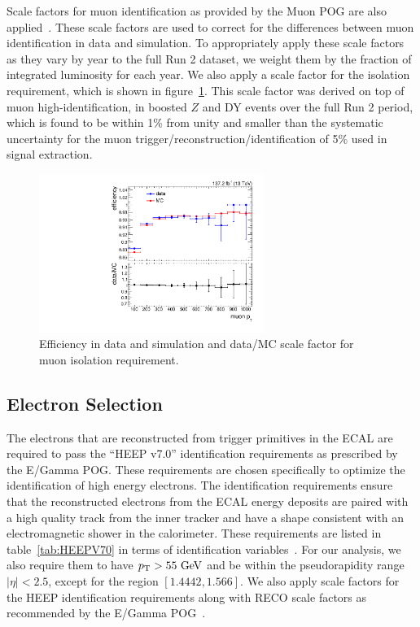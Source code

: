 Scale factors for muon identification as provided by the Muon POG are also applied~\cite{MuonPAGs}.
These scale factors are used to correct for the differences between muon identification in data and simulation.
To appropriately apply these scale factors as they vary by year to the full Run 2 dataset, we weight them by the fraction of integrated luminosity for each year.
We also apply a scale factor for the isolation requirement, which is shown in figure~\ref{fig:muonIsoSF}.
This scale factor was derived on top of muon high-\pt identification, in boosted $Z$ and DY events over the full Run 2 period, which is found to be within 1\% from unity and smaller than the systematic uncertainty for the muon trigger/reconstruction/identification of 5\% used in signal extraction.

\begin{figure}[htbp]
  \centering
  \includegraphics[width=0.65\textwidth]{fig/eventSelection/muonFullIsoSF.pdf}
  \caption{
    Efficiency in data and simulation and data/MC scale factor for muon isolation requirement.
  }
  \label{fig:muonIsoSF}
\end{figure}

\subsection{Electron Selection}
\label{subsec:elecSelect}

The electrons that are reconstructed from trigger primitives in the ECAL are required to pass the ``HEEP v7.0'' identification requirements as prescribed by the E/Gamma POG. %
These requirements are chosen specifically to optimize the identification of high energy electrons.
The identification requirements ensure that the reconstructed electrons from the ECAL energy deposits are paired with a high quality track from the inner tracker and have a shape consistent with an electromagnetic shower in the calorimeter.
These requirements are listed in table~\ref{tab:HEEPV70} in terms of identification variables~\cite{electron_2015}.
For our analysis, we also require them to have $\pt>55\unit{GeV}$ and be within the pseudorapidity range $|\eta|<2.5$, except for the region $[1.4442,1.566]$. %
We also apply scale factors for the HEEP identification requirements along with RECO scale factors as recommended by the E/Gamma POG~\cite{EgammaScale}.

